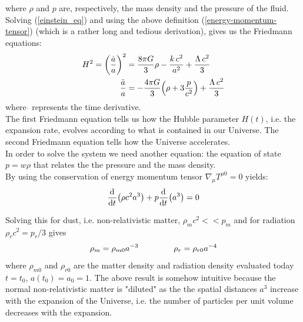 \documentclass{article}
\newcommand{\beq}{\begin{equation}}
\newcommand{\eeq}{\end{equation}}
\begin{document}
where $\rho$ and $p$ are, respectively, the mass density and the pressure of the fluid.\\
Solving (\ref{einstein_eq}) and using the above definition (\ref{energy-momentum-tensor}) (which is a rather long and tedious derivation), gives us the Friedmann equations:
\begin{equation}
\label{firedmann_eq}
\begin{split}
H^2 = \qty(\frac{\dot{a}}{a})^2 &= \dfrac{8 \pi G}{3} \rho -\dfrac{k \, c^2}{a^2} + \frac{\Lambda \, c^2}{3} \\
\vspace{1.5cm}
\dfrac{\ddot{a}}{a} &= -\dfrac{4 \pi G}{3} \qty(\rho + 3 \dfrac{p}{c^2} ) +  \frac{\Lambda \, c^2}{3}
\end{split}
\end{equation}
where  $\dot{}$  represents the time derivative.\\
The first Friedmann equation tells us how the Hubble parameter $H(t)$, i.e. the expansion rate,  evolves according to what is contained in our Universe.
The second Friedmann equation tells how the Universe accelerates.\\
In order to solve the system we need another equation: the equation of state $p = w \rho$ that relates the the pressure and the mass density.\\
%
%
%
By using the conservation of energy momentum tensor $\nabla_\mu T^{\mu 0} =0 $ yields:
\beq
\label{energy_cons}
\dv[]{}{t}\qty(\rho c^2 a^3) + p \dv[]{}{t} \qty(a^3)  = 0
\eeq
%
%
%

Solving this for dust, i.e. non-relativistic matter, $\rho_m c^2 << p_m$ and for radiation $\rho_r c^2 = p_r/3$ gives
\begin{equation}
\begin{split}
\rho_m = \rho_{m 0} a^{-3} \hspace{1.5cm} \rho_r = \rho_{r 0} a^{-4} \notag
\end{split}
\end{equation}
where $\rho_{m 0}$ and $\rho_{r 0}$ are the matter density and radiation density evaluated today $t = t_0$, $a(t_0) = a_0 =1$.
The above result is somehow intuitive because the normal non-relativistic matter is "diluted" as the the spatial distances $a^3$  increase with the expansion of the Universe, i.e. the number of particles per unit volume decreases with the expansion.
\end{document}
